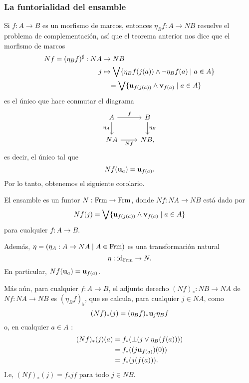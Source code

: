 \subsubsection{La funtorialidad del ensamble}\label{functen}

Si $f:A\to B$ es un morfismo de marcos, entonces
$\eta_Bf:A\to NB$ resuelve
el problema de complementación, así que el teorema anterior nos dice
que el morfismo de marcos
\begin{align}
  Nf=(\eta_Bf)^{\sharp}:NA&\to NB \\
  j&\mapsto \bigvee\{\eta_Bf(j(a)) \wedge \neg \eta_Bf(a)\mid a\in A\} \\
   &\quad =\bigvee\{\mathbf u_{f(j(a))} \wedge \mathbf v_{f(a)}\mid a\in A\}
\end{align}
es el único que hace conmutar el diagrama
\begin{equation}
  \begin{tikzcd}
    A \ar[r,"f"] \ar[d,"\eta_A"'] & B \ar[d,"\eta_B"] \\
    NA \ar[r,"Nf"'] & NB,
  \end{tikzcd}
\end{equation}
es decir, el único tal que
\begin{equation}
  Nf(\mathbf u_{a}) = \mathbf u_{f(a)}
.\end{equation}
Por lo tanto, obtenemos el siguiente corolario.
\begin{corollary}
  El ensamble es un funtor $N:\mathrm{Frm}\to\mathrm{Frm}$, donde $Nf:NA\to NB$ 
  está dado por
  \begin{equation}
    Nf(j) = \bigvee\{\mathbf u_{f(j(a))} \wedge \mathbf v_{f(a)}\mid a\in A\}
  \end{equation}
  para cualquier $f:A\to B$.

  Además, $\eta=(\eta_A:A\to NA\mid A\in\mathrm{Frm})$ es una transformación
  natural
  \begin{equation}
    \eta:\mathrm{id}_{\mathrm{Frm}} \to N
  .\end{equation}
  En particular, $Nf(\mathbf u_{a}) = \mathbf u_{f(a)}$.

  Más aún, para cualquier $f:A\to B$, el adjunto derecho $(Nf)_*:NB\to
  NA$ de $Nf:NA\to NB$ es $(\eta_Bf)_\flat$, que se calcula, para
  cualquier $j\in NA$, como
  \begin{equation}
    (Nf)_*(j) = (\eta_Bf)_*\mathbf u_{j}\eta_Bf
  \end{equation}
  o, en cualquier $a\in A$ :
  \begin{align}
    (Nf)_*(j)(a)
    &= f_*(\bot(j\vee\eta_B(f(a)))) \\
    &= f_*((j\mathbf u_{f(a)})(0)) \\
    &= f_*(j(f(a)))
  .\end{align}
  I.e, $(Nf)_*(j) = f_*jf$ para todo $j\in NB$.
\end{corollary}

